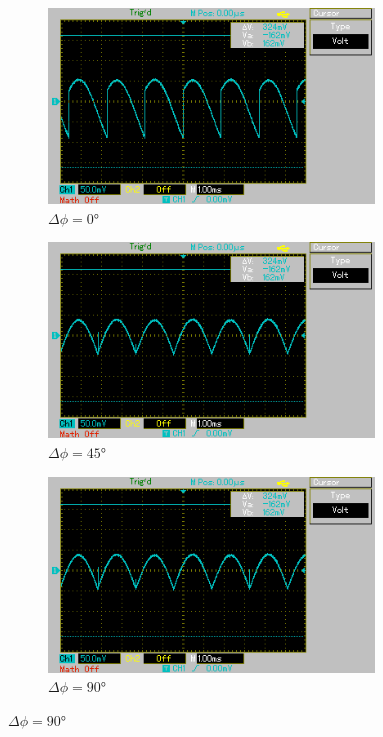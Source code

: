 \begin{figure}
  \centering
  \begin{subfigure}{0.32\textwidth}
    \centering
    \includegraphics[width=0.95\textwidth]{content/0deg.png}
    \caption{$\Delta\phi = 0°$}
    \label{fig:0-deg}
  \end{subfigure}
  \begin{subfigure}{0.32\textwidth}
    \centering
    \includegraphics[width=0.95\textwidth]{content/45deg.png}
    \caption{$\Delta\phi = 45°$}
    \label{fig:45-deg}
  \end{subfigure}
  \begin{subfigure}{0.32\textwidth}
    \centering
    \includegraphics[width=0.95\textwidth]{content/45deg.png}
    \caption{$\Delta\phi = 90°$}
    \label{fig:90-deg}
  \end{subfigure}


\end{figure}
